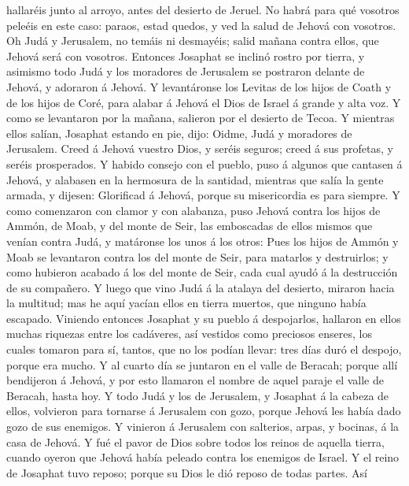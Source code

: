 hallaréis junto al arroyo, antes del desierto de Jeruel. 
No habrá para qué vosotros peleéis en este caso: paraos, estad quedos, y
ved la salud de Jehová con vosotros. Oh Judá y Jerusalem, no temáis ni
desmayéis; salid mañana contra ellos, que Jehová será con vosotros.
 Entonces Josaphat se inclinó rostro por tierra, y asimismo
todo Judá y los moradores de Jerusalem se postraron delante de Jehová, y
adoraron á Jehová.  Y levantáronse los Levitas de los hijos
de Coath y de los hijos de Coré, para alabar á Jehová el Dios de Israel
á grande y alta voz.  Y como se levantaron por la mañana,
salieron por el desierto de Tecoa. Y mientras ellos salían, Josaphat
estando en pie, dijo: Oidme, Judá y moradores de Jerusalem. Creed á
Jehová vuestro Dios, y seréis seguros; creed á sus profetas, y seréis
prosperados.  Y habido consejo con el pueblo, puso á
algunos que cantasen á Jehová, y alabasen en la hermosura de la
santidad, mientras que salía la gente armada, y dijesen: Glorificad á
Jehová, porque su misericordia es para siempre.  Y como
comenzaron con clamor y con alabanza, puso Jehová contra los hijos de
Ammón, de Moab, y del monte de Seir, las emboscadas de ellos mismos que
venían contra Judá, y matáronse los unos á los otros:  Pues
los hijos de Ammón y Moab se levantaron contra los del monte de Seir,
para matarlos y destruirlos; y como hubieron acabado á los del monte de
Seir, cada cual ayudó á la destrucción de su compañero.  Y
luego que vino Judá á la atalaya del desierto, miraron hacia la
multitud; mas he aquí yacían ellos en tierra muertos, que ninguno había
escapado.  Viniendo entonces Josaphat y su pueblo á
despojarlos, hallaron en ellos muchas riquezas entre los cadáveres, así
vestidos como preciosos enseres, los cuales tomaron para sí, tantos, que
no los podían llevar: tres días duró el despojo, porque era mucho.
 Y al cuarto día se juntaron en el valle de Beracah; porque
allí bendijeron á Jehová, y por esto llamaron el nombre de aquel paraje
el valle de Beracah, hasta hoy.  Y todo Judá y los de
Jerusalem, y Josaphat á la cabeza de ellos, volvieron para tornarse á
Jerusalem con gozo, porque Jehová les había dado gozo de sus enemigos.
 Y vinieron á Jerusalem con salterios, arpas, y bocinas, á
la casa de Jehová.  Y fué el pavor de Dios sobre todos los
reinos de aquella tierra, cuando oyeron que Jehová había peleado contra
los enemigos de Israel.  Y el reino de Josaphat tuvo
reposo; porque su Dios le dió reposo de todas partes.  Así
